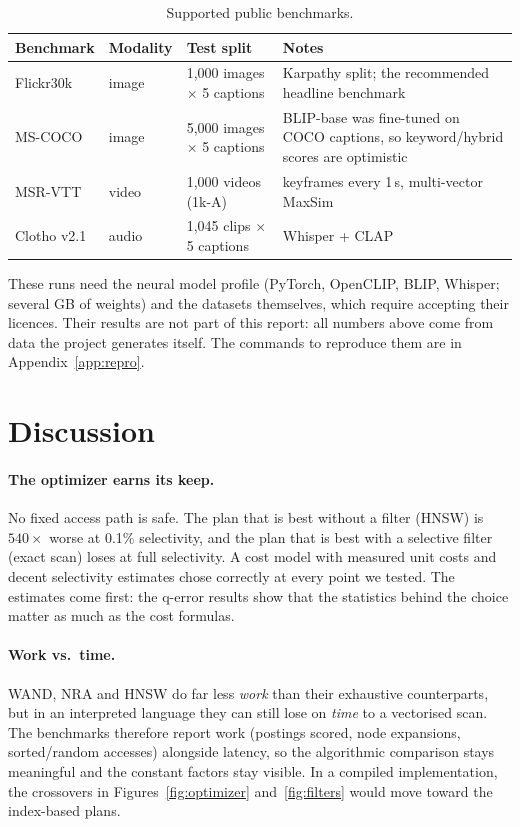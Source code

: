 \documentclass[11pt,a4paper]{article}
\begin{document}
\begin{table}[h]
\centering\small
\begin{tabularx}{\linewidth}{lllL}
\toprule
Benchmark & Modality & Test split & Notes \\
\midrule
Flickr30k~\cite{flickr} & image & 1{,}000 images $\times$ 5 captions & Karpathy split; the recommended headline benchmark \\
MS-COCO~\cite{coco} & image & 5{,}000 images $\times$ 5 captions & BLIP-base was fine-tuned on COCO captions, so keyword/hybrid scores are optimistic \\
MSR-VTT~\cite{msrvtt} & video & 1{,}000 videos (1k-A) & keyframes every 1\,s, multi-vector MaxSim \\
Clotho v2.1~\cite{clotho} & audio & 1{,}045 clips $\times$ 5 captions & Whisper + CLAP \\
\bottomrule
\end{tabularx}
\caption{Supported public benchmarks.}
\label{tab:public}
\end{table}

These runs need the neural model profile (PyTorch, OpenCLIP, BLIP, Whisper; several GB of weights)
and the datasets themselves, which require accepting their licences. Their results are not part of
this report: all numbers above come from data the project generates itself. The commands to
reproduce them are in Appendix~\ref{app:repro}.

\section{Discussion}
\label{sec:discussion}

\paragraph{The optimizer earns its keep.} No fixed access path is safe. The plan that is best without
a filter (HNSW) is $540\times$ worse at 0.1\% selectivity, and the plan that is best with a selective
filter (exact scan) loses at full selectivity. A cost model with measured unit costs and decent
selectivity estimates chose correctly at every point we tested. The estimates come first: the q-error
results show that the statistics behind the choice matter as much as the cost formulas.

\paragraph{Work vs.\ time.} WAND, NRA and HNSW do far less \emph{work} than their exhaustive
counterparts, but in an interpreted language they can still lose on \emph{time} to a vectorised scan.
The benchmarks therefore report work (postings scored, node expansions, sorted/random accesses)
alongside latency, so the algorithmic comparison stays meaningful and the constant factors stay visible.
In a compiled implementation, the crossovers in Figures~\ref{fig:optimizer} and~\ref{fig:filters}
would move toward the index-based plans.
\end{document}
